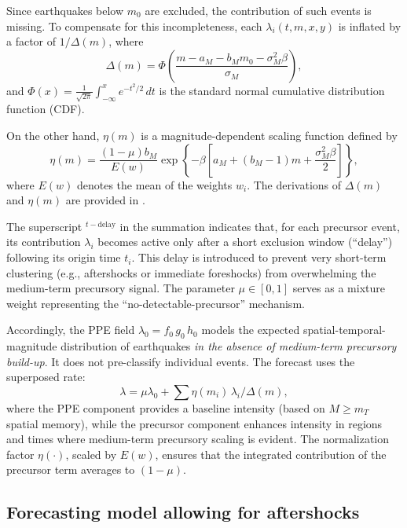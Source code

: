 \documentclass[linenum,doublespace,onecolumn]{SSA-SRL}
\theoremstyle{lemma}
\begin{document}
Since earthquakes below $m_0$ are excluded, the contribution of such events is missing. To compensate for this incompleteness, each $\lambda_i(t,m,x,y)$ is inflated by a factor of $1/\Delta(m)$, where
\begin{equation*}
\Delta(m) = \Phi\!\left(\frac{m - a_M - b_M m_0 - \sigma_M^2 \beta}{\sigma_M}\right),
\end{equation*}
and $\Phi(x) = \frac{1}{\sqrt{2\pi}} \int_{-\infty}^x e^{-t^2/2}\,dt$ is the standard normal cumulative distribution function (CDF).

On the other hand, $\eta(m)$ is a magnitude-dependent scaling function defined by
\begin{equation}\label{emi}
    \eta(m) = \frac{(1 - \mu) b_M}{E(w)} \exp\!\left\{ -\beta \left[ a_M + (b_M - 1)m + \frac{\sigma_M^2 \beta}{2} \right] \right\},
\end{equation}
where $E(w)$ denotes the mean of the weights $w_i$. The derivations of $\Delta(m)$ and $\eta(m)$ are provided in .

The superscript ${}^{t - \text{delay}}$ in the summation indicates that, for each precursor event, its contribution $\lambda_i$ becomes active only after a short exclusion window (“delay”) following its origin time $t_i$. This delay is introduced to prevent very short-term clustering (e.g., aftershocks or immediate foreshocks) from overwhelming the medium-term precursory signal. The parameter $\mu \in [0,1]$ serves as a mixture weight representing the ``no-detectable-precursor'' mechanism.

Accordingly, the PPE field $\lambda_0 = f_0\,g_0\,h_0$ models the expected spatial-temporal-magnitude distribution of earthquakes \emph{in the absence of medium-term precursory build-up}. It does not pre-classify individual events. The forecast uses the superposed rate:
\[
\lambda = \mu \lambda_0 + \sum \eta(m_i)\,\lambda_i / \Delta(m),
\]
where the PPE component provides a baseline intensity (based on $M \ge m_T$ spatial memory), while the precursor component enhances intensity in regions and times where medium-term precursory scaling is evident. The normalization factor $\eta(\cdot)$, scaled by $E(w)$, ensures that the integrated contribution of the precursor term averages to $(1 - \mu)$.


\subsection{Forecasting model allowing for aftershocks}
\end{document}
